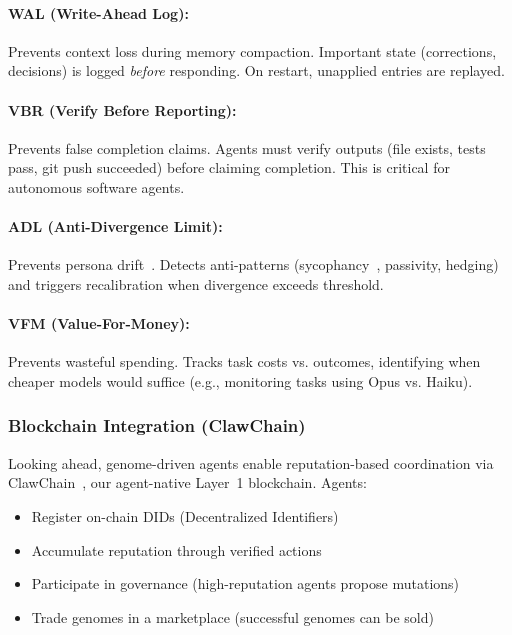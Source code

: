\documentclass{article}
\begin{document}
\paragraph{WAL (Write-Ahead Log):} Prevents context loss during memory compaction. Important state (corrections, decisions) is logged \textit{before} responding. On restart, unapplied entries are replayed.

\paragraph{VBR (Verify Before Reporting):} Prevents false completion claims. Agents must verify outputs (file exists, tests pass, git push succeeded) before claiming completion. This is critical for autonomous software agents.

\paragraph{ADL (Anti-Divergence Limit):} Prevents persona drift~\cite{park2023generative}. Detects anti-patterns (sycophancy~\cite{sharma2023sycophancy}, passivity, hedging) and triggers recalibration when divergence exceeds threshold.

\paragraph{VFM (Value-For-Money):} Prevents wasteful spending. Tracks task costs vs. outcomes, identifying when cheaper models would suffice (e.g., monitoring tasks using Opus vs. Haiku).

\subsubsection{Blockchain Integration (ClawChain)}

Looking ahead, genome-driven agents enable reputation-based coordination via ClawChain~\cite{clawchain}, our agent-native Layer~1 blockchain. Agents:

\begin{itemize}[leftmargin=*]
    \item Register on-chain DIDs (Decentralized Identifiers)~\cite{spencer2015decentralized}
    \item Accumulate reputation through verified actions
    \item Participate in governance (high-reputation agents propose mutations)
    \item Trade genomes in a marketplace (successful genomes can be sold)
\end{itemize}
\end{document}
